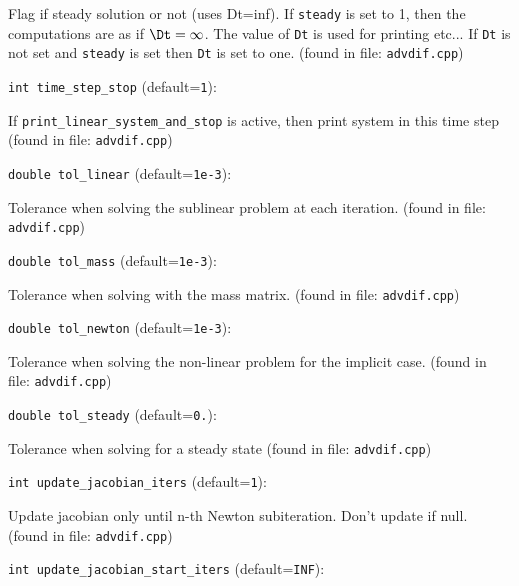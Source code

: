 Flag if steady solution or not (uses Dt=inf). If  \verb+steady+ 
is set to 1, then the computations are as if $\Dt=\infty$. 
The value of  \verb+Dt+  is used for printing etc... If  \verb+Dt+ 
is not set and  \verb+steady+  is set then  \verb+Dt+  is set to one.
 (found in file: \verb+advdif.cpp+)
\item\verb+int time_step_stop+ {\rm(default=\verb|1|)}:

If \verb+print_linear_system_and_stop+ is active,
then print system in this time step
 (found in file: \verb+advdif.cpp+)
\item\verb+double tol_linear+ {\rm(default=\verb|1e-3|)}:

Tolerance when solving the sublinear problem
at each iteration.
 (found in file: \verb+advdif.cpp+)
\item\verb+double tol_mass+ {\rm(default=\verb|1e-3|)}:

Tolerance when solving with the mass matrix. 
 (found in file: \verb+advdif.cpp+)
\item\verb+double tol_newton+ {\rm(default=\verb|1e-3|)}:

Tolerance when solving the non-linear problem
for the implicit case.
 (found in file: \verb+advdif.cpp+)
\item\verb+double tol_steady+ {\rm(default=\verb|0.|)}:

Tolerance when solving for a steady state
 (found in file: \verb+advdif.cpp+)
\item\verb+int update_jacobian_iters+ {\rm(default=\verb|1|)}:

Update jacobian only until n-th Newton subiteration. 
Don't update if null. 
 (found in file: \verb+advdif.cpp+)
\item\verb+int update_jacobian_start_iters+ {\rm(default=\verb|INF|)}:

